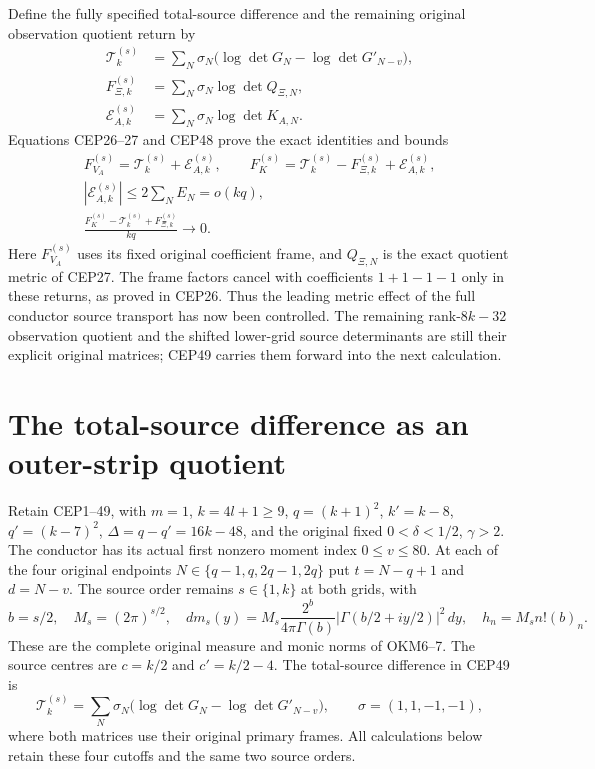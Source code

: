 \documentclass[11pt,a4paper]{article}
\begin{document}
Define the fully specified total-source difference and the
remaining original observation quotient return by
\[
 \begin{split}
 \mathcal T_k^{(s)}
   &=\sum_N\sigma_N
          \bigl(\log\det G_N-\log\det G'_{N-v}\bigr),\\
 F_{\Xi,k}^{(s)}&=\sum_N\sigma_N\log\det Q_{\Xi,N},\\
 \mathcal E_{A,k}^{(s)}
   &=\sum_N\sigma_N\log\det K_{A,N}.
 \end{split}
\]
Equations CEP26--27 and CEP48 prove the exact identities and bounds
\[
 \begin{gathered}
 F_{V_A}^{(s)}
      =\mathcal T_k^{(s)}+\mathcal E_{A,k}^{(s)},\qquad
 F_K^{(s)}
      =\mathcal T_k^{(s)}-F_{\Xi,k}^{(s)}
                              +\mathcal E_{A,k}^{(s)},\\
 |\mathcal E_{A,k}^{(s)}|\le2\sum_N E_N=o(kq),\\
 \frac{F_K^{(s)}-\mathcal T_k^{(s)}+F_{\Xi,k}^{(s)}}{kq}
        \longrightarrow0 .
 \end{gathered}\tag{CEP49}
\]
Here $F_{V_A}^{(s)}$ uses its fixed original coefficient frame,
and $Q_{\Xi,N}$ is the exact quotient metric of CEP27.
The frame factors cancel with coefficients $1+1-1-1$ only in
these returns, as proved in CEP26. Thus the leading metric
effect of the full conductor source transport has now been
controlled. The remaining rank-$8k-32$ observation quotient
and the shifted lower-grid source determinants are still their
explicit original matrices; CEP49 carries them forward into
the next calculation.



\clearpage
\section{The total-source difference as an outer-strip quotient}
\label{sec:CTV}

Retain CEP1--49, with $m=1$, $k=4l+1\ge9$,
$q=(k+1)^2$, $k'=k-8$, $q'=(k-7)^2$,
$\Delta=q-q'=16k-48$, and the original fixed
$0<\delta<1/2$, $\gamma>2$. The conductor has its actual
first nonzero moment index $0\le v\le80$. At each of the four
original endpoints $N\in\{q-1,q,2q-1,2q\}$ put
$t=N-q+1$ and $d=N-v$. The source order remains
$s\in\{1,k\}$ at both grids, with
\[
 b=s/2,\quad M_s=(2\pi)^{s/2},\quad
 dm_s(y)=M_s\frac{2^b}{4\pi\Gamma(b)}
             |\Gamma(b/2+iy/2)|^2\,dy,\quad
 h_n=M_s n!(b)_n .
 \tag{CTV1}
\]
These are the complete original measure and monic norms of
OKM6--7. The source centres are $c=k/2$ and $c'=k/2-4$.
The total-source difference in CEP49 is
\[
 \mathcal T_k^{(s)}
   =\sum_N\sigma_N\bigl(\log\det G_N-\log\det G'_{N-v}\bigr),
 \qquad \sigma=(1,1,-1,-1),
 \tag{CTV2}
\]
where both matrices use their original primary frames.
All calculations below retain these four cutoffs and the same
two source orders.
\end{document}
